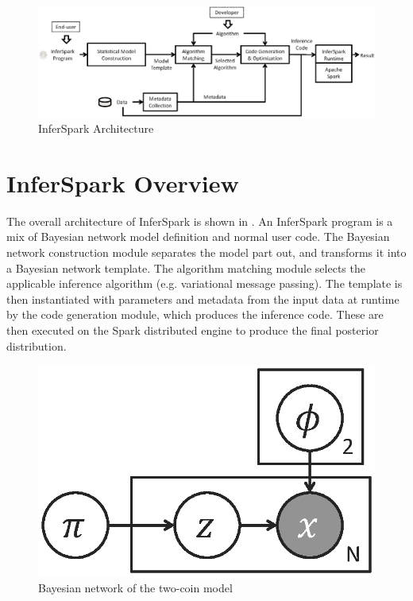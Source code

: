 \begin{figure}[th]
\centering
    \includegraphics[width=0.8\linewidth]{figs/workflow_future.eps}
    \vspace*{-10pt}
    \caption{InferSpark Architecture}
    \label{fig:workflow}
\end{figure}

\section{InferSpark Overview}
\label{sec:framework}

The overall architecture of InferSpark is shown in .  An
InferSpark program is a mix of Bayesian network model definition and normal
user code. The Bayesian network construction module separates the model part
out, and transforms it into a Bayesian network template. The algorithm
matching module selects the applicable inference algorithm (e.g. variational
message passing). The template is
then instantiated with parameters and metadata from the input data at runtime
by the code generation module, which produces the inference code. These are
then executed on the Spark distributed engine to produce the final posterior
distribution.

\begin{figure}[th]
	\centering
	\includegraphics[scale=0.3]{figs/two_coins_latent.eps}
    \vspace*{-10pt}
	\caption{Bayesian network of the two-coin model}
	\label{fig:two_coins}
\end{figure}

